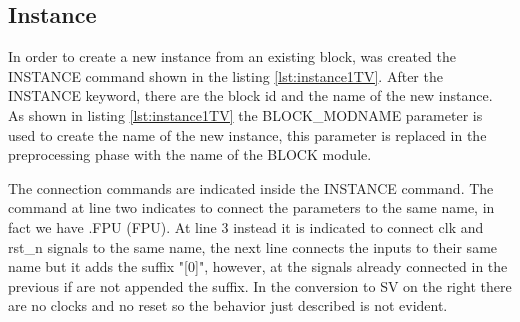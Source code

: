 {{    	\subsection{Instance}{

    
            In order to create a new instance from an existing block,  was created the INSTANCE command shown in the listing \ref{lst:instance1TV}. After the INSTANCE keyword, there are the block id and the name of the new instance. As shown in listing \ref{lst:instance1TV} the BLOCK\_MODNAME parameter is used to create the name of the new instance, this parameter is replaced in the preprocessing phase with the name of the BLOCK module.
            
            The connection commands are indicated inside the INSTANCE command. The command at line two indicates to connect the parameters to the same name, in fact we have .FPU (FPU). At line 3 instead it is indicated to connect clk and rst\_n signals to the same name, the next line connects the inputs to their same name but it adds the suffix "[0]", however, at the signals already connected in the previous if are not appended the suffix. In the conversion to SV on the right there are no clocks and no reset so the behavior just described is not evident.
            
}}}
